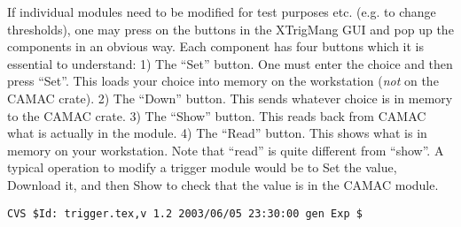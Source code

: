 \par
If individual modules need to be modified
for test purposes etc. (e.g. to change thresholds),
one may press on the buttons in the XTrigMang
GUI and pop up the components in an obvious way.
Each component has four buttons which it is
essential to understand: 
\hskip 0.05in
1) The ``Set'' button.  One must enter the choice
and then press ``Set''.  This loads your choice
into memory on the workstation ({\it not} on 
the CAMAC crate).
\hskip 0.05in
2) The ``Down'' button.  This sends whatever choice
is in memory to the CAMAC crate.
\hskip 0.05in
3) The ``Show'' button.  This reads back from CAMAC
what is actually in the module.
\hskip 0.05in
4) The ``Read'' button.  This shows what is in
memory on your workstation.  Note that ``read'' is quite 
different from ``show''.
A typical operation to modify a trigger module
would be to Set the value,
Download it, and then Show to check that the value
is in the CAMAC module.  

%
%
{\small
\begin{verbatim}CVS $Id: trigger.tex,v 1.2 2003/06/05 23:30:00 gen Exp $\end{verbatim}
}
